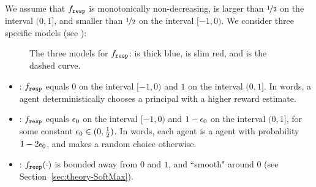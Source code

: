 We assume that $f_{\mathtt{resp}}$ is monotonically non-decreasing, is larger than $\nicefrac12$ on the interval $(0,1]$, and smaller than $\nicefrac12$ on the interval $[-1,0)$. We consider three specific models (see ):

\begin{figure}[t]
\begin{center}
\end{center}
\caption{The three models for $f_{\mathtt{resp}}$: \HardMax is thick blue, \HardMaxRandom is slim red, and \SoftMaxRandom is the dashed curve.}
\label{fig:response-functions}
\end{figure}

\begin{itemize}
\item \HardMax: $f_{\mathtt{resp}}$ equals $0$ on the interval $[-1,0)$ and $1$
  on the interval $(0,1]$. In words, a \HardMax agent
  deterministically chooses a principal with a higher reward estimate.

\item \HardMaxRandom:
    $f_{\mathtt{resp}}$ equals $\epsilon_0$ on the interval $[-1,0)$ and $1-\epsilon_0$ on the interval $(0,1]$, for some constant $\epsilon_0\in (0,\tfrac12)$. In words, each agent is a \HardMax agent with probability $1-2\epsilon_0$, and makes a random choice otherwise.


\item \SoftMaxRandom: $f_{\mathtt{resp}}(\cdot)$ is bounded away from $0$ and $1$, and ``smooth" around $0$ (see Section~\ref{sec:theory-SoftMax}).
\end{itemize}


